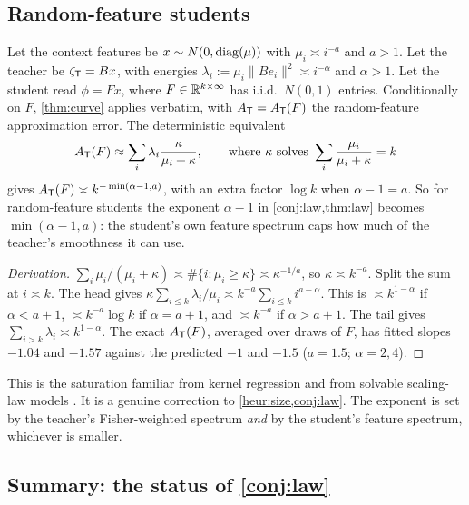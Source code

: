 \subsection{Random-feature students}\label{sec:law-rf}

\begin{proposition}\label{prop:rf}
\Kn\Ck Let the context features be $x\sim N(0,\operatorname{diag}(\mu))$ with $\mu_i\asymp i^{-a}$ and $a>1$. Let the teacher be $\zeta_{\mathsf{T}}=Bx$, with energies
$\lambda_i:=\mu_i\|Be_i\|^2\asymp i^{-\alpha}$ and $\alpha>1$. Let the student read $\phi=Fx$, where $F\in\mathbb{R}^{k\times\infty}$ has i.i.d.\ $N(0,1)$
entries. Conditionally on $F$, \cref{thm:curve} applies verbatim, with $A_{\mathsf{T}}=A_{\mathsf{T}}(F)$ the random-feature approximation
error. The deterministic equivalent
\[
A_{\mathsf{T}}(F)\approx\sum_i\lambda_i\frac{\kappa}{\mu_i+\kappa},\qquad\text{where $\kappa$ solves}\ \sum_i\frac{\mu_i}{\mu_i+\kappa}=k
\]
\citep{bach2024high,atanasov2024scaling,defilippis2024dimension} gives $A_{\mathsf{T}}(F)\asymp k^{-\min(\alpha-1,a)}$, with an extra factor
$\log k$ when $\alpha-1=a$. So for random-feature students the exponent $\alpha-1$ in \cref{conj:law,thm:law} becomes
$\min(\alpha-1,a)$: the student's own feature spectrum caps how much of the teacher's smoothness it can use.
\end{proposition}
\begin{proof}[Derivation]
$\sum_i\mu_i/(\mu_i+\kappa)\asymp\#\{i:\mu_i\ge\kappa\}\asymp\kappa^{-1/a}$, so $\kappa\asymp k^{-a}$. Split the sum at $i\asymp k$. The head gives
$\kappa\sum_{i\le k}\lambda_i/\mu_i\asymp k^{-a}\sum_{i\le k}i^{a-\alpha}$. This is $\asymp k^{1-\alpha}$ if $\alpha<a+1$, $\asymp k^{-a}\log k$ if $\alpha=a+1$, and
$\asymp k^{-a}$ if $\alpha>a+1$. The tail gives $\sum_{i>k}\lambda_i\asymp k^{1-\alpha}$. The exact $A_{\mathsf{T}}(F)$, averaged over draws of $F$, has
fitted slopes $-1.04$ and $-1.57$ against the predicted $-1$ and $-1.5$ ($a=1.5$; $\alpha=2,4$).
\end{proof}

This is the saturation familiar from kernel regression and from solvable scaling-law models
\citep{maloney2022solvable,bahri2024explaining,paquette2024phases,lin2024scaling}. It is a genuine correction
to \cref{heur:size,conj:law}. The exponent is set by the teacher's Fisher-weighted spectrum \emph{and} by the
student's feature spectrum, whichever is smaller.

\subsection{Summary: the status of \texorpdfstring{\cref{conj:law}}{Conjecture 3.14}}\label{sec:law-summary}

